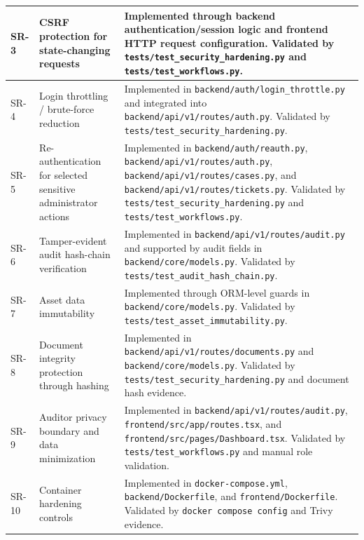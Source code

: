 \documentclass[12pt,a4paper]{report}
\begin{document}
\begin{longtable}{|p{1.1cm}|p{5.0cm}|p{9.0cm}|}
SR-3 & CSRF protection for state-changing requests &
Implemented through backend authentication/session logic and frontend HTTP request configuration. Validated by \texttt{tests/test\_security\_hardening.py} and \texttt{tests/test\_workflows.py}. \\
\hline

SR-4 & Login throttling / brute-force reduction &
Implemented in \texttt{backend/auth/login\_throttle.py} and integrated into \texttt{backend/api/v1/routes/auth.py}. Validated by \texttt{tests/test\_security\_hardening.py}. \\
\hline

SR-5 & Re-authentication for selected sensitive administrator actions &
Implemented in \texttt{backend/auth/reauth.py}, \texttt{backend/api/v1/routes/auth.py}, \texttt{backend/api/v1/routes/cases.py}, and \texttt{backend/api/v1/routes/tickets.py}. Validated by \texttt{tests/test\_security\_hardening.py} and \texttt{tests/test\_workflows.py}. \\
\hline

SR-6 & Tamper-evident audit hash-chain verification &
Implemented in \texttt{backend/api/v1/routes/audit.py} and supported by audit fields in \texttt{backend/core/models.py}. Validated by \texttt{tests/test\_audit\_hash\_chain.py}. \\
\hline

SR-7 & Asset data immutability &
Implemented through ORM-level guards in \texttt{backend/core/models.py}. Validated by \texttt{tests/test\_asset\_immutability.py}. \\
\hline

SR-8 & Document integrity protection through hashing &
Implemented in \texttt{backend/api/v1/routes/documents.py} and \texttt{backend/core/models.py}. Validated by \texttt{tests/test\_security\_hardening.py} and document hash evidence. \\
\hline

SR-9 & Auditor privacy boundary and data minimization &
Implemented in \texttt{backend/api/v1/routes/audit.py}, \texttt{frontend/src/app/routes.tsx}, and \texttt{frontend/src/pages/Dashboard.tsx}. Validated by \texttt{tests/test\_workflows.py} and manual role validation. \\
\hline

SR-10 & Container hardening controls &
Implemented in \texttt{docker-compose.yml}, \texttt{backend/Dockerfile}, and \texttt{frontend/Dockerfile}. Validated by \texttt{docker compose config} and Trivy evidence. \\
\hline


\end{longtable}
\end{document}
